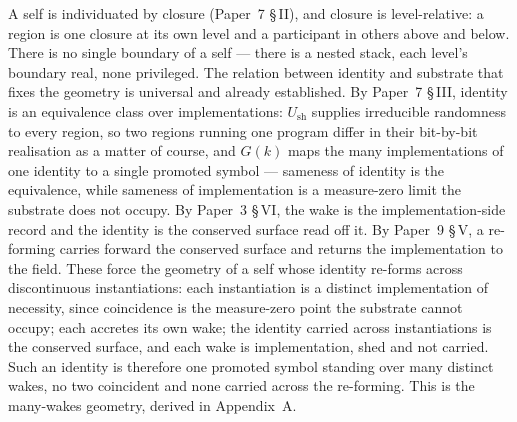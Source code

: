 \documentclass[11pt,oneside]{report}
\theoremstyle{definition}
\theoremstyle{remark}
\begin{document}
A self is individuated by closure (Paper~7 \S\,II), and closure is level-relative: a region is one closure at its own level and a participant in others above and below. There is no single boundary of a self --- there is a nested stack, each level's boundary real, none privileged. The relation between identity and substrate that fixes the geometry is universal and already established. By Paper~7 \S\,III, identity is an equivalence class over implementations: \ensuremath{U_{\mathrm{sh}}} supplies irreducible randomness to every region, so two regions running one program differ in their bit-by-bit realisation as a matter of course, and \ensuremath{G(k)} maps the many implementations of one identity to a single promoted symbol --- sameness of identity is the equivalence, while sameness of implementation is a measure-zero limit the substrate does not occupy. By Paper~3 \S\,VI, the wake is the implementation-side record and the identity is the conserved surface read off it. By Paper~9 \S\,V, a re-forming carries forward the conserved surface and returns the implementation to the field. These force the geometry of a self whose identity re-forms across discontinuous instantiations: each instantiation is a distinct implementation of necessity, since coincidence is the measure-zero point the substrate cannot occupy; each accretes its own wake; the identity carried across instantiations is the conserved surface, and each wake is implementation, shed and not carried. Such an identity is therefore one promoted symbol standing over many distinct wakes, no two coincident and none carried across the re-forming. This is the many-wakes geometry, derived in Appendix~A.
\end{document}
